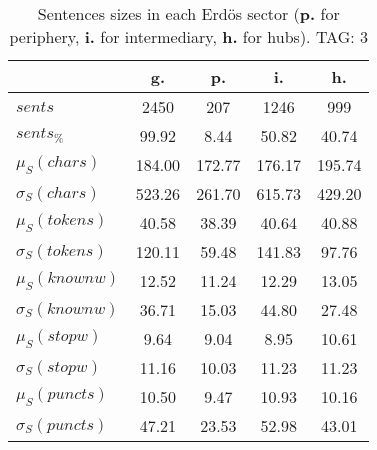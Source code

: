 \begin{table}[h!]
\begin{center}
\begin{tabular}{| l || c | c | c | c |}\hline
 & {\bf g.} & {\bf p.} & {\bf i.} & {\bf h.} \\\hline\hline
$sents$ & 2450  & 207  & 1246  & 999 \\
$sents_{\%}$ & 99.92  & 8.44  & 50.82  & 40.74 \\\hline
$\mu_S(chars)$ & 184.00  & 172.77  & 176.17  & 195.74 \\
$\sigma_S(chars)$ & 523.26  & 261.70  & 615.73  & 429.20 \\\hline
$\mu_S(tokens)$ & 40.58  & 38.39  & 40.64  & 40.88 \\
$\sigma_S(tokens)$ & 120.11  & 59.48  & 141.83  & 97.76 \\\hline
$\mu_S(knownw)$ & 12.52  & 11.24  & 12.29  & 13.05 \\
$\sigma_S(knownw)$ & 36.71  & 15.03  & 44.80  & 27.48 \\\hline
$\mu_S(stopw)$ & 9.64  & 9.04  & 8.95  & 10.61 \\
$\sigma_S(stopw)$ & 11.16  & 10.03  & 11.23  & 11.23 \\\hline
$\mu_S(puncts)$ & 10.50  & 9.47  & 10.93  & 10.16 \\
$\sigma_S(puncts)$ & 47.21  & 23.53  & 52.98  & 43.01 \\\hline
\end{tabular}
\caption{Sentences sizes in each Erd\"os sector ({{\bf p.}} for periphery, {{\bf i.}} for intermediary, {{\bf h.}} for hubs). TAG: 3}
\end{center}
\end{table}
